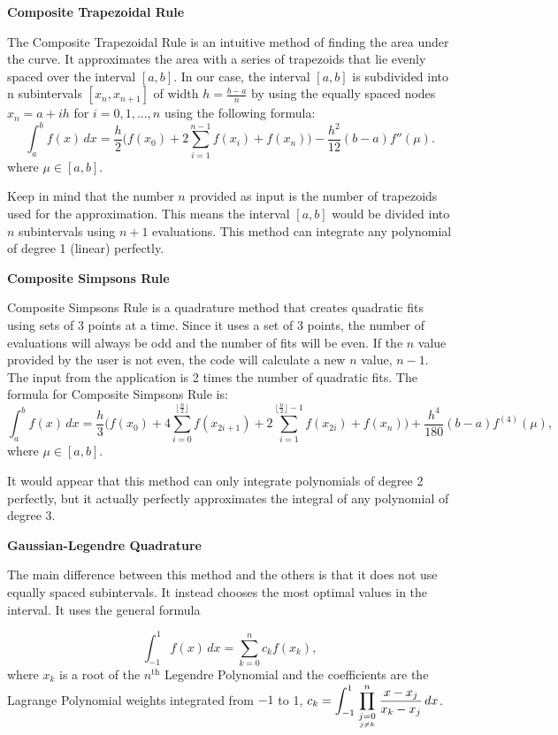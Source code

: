 \documentclass[12pt]{article}
\newcommand{\newLine}{\vspace{5mm}}
\newcommand{\integral}[3]{\text{$\int^{#2}_{#1} #3\,dx$}}
\newcommand{\summation}[3]{\text{$\sum^{#2}_{#1} #3$}}
\newcommand{\floor}[1]{\text{$\lfloor#1\rfloor$}}
\begin{document}
\newLine\noindent  \textbf{Composite Trapezoidal Rule}

The Composite Trapezoidal Rule is an intuitive method of finding the area under the curve. It approximates the area with a series of trapezoids that lie evenly spaced over the interval $[a,b]$.
In our case, the interval $[a,b]$ is subdivided into n subintervals $[x_n, x_{n+1}]$ of width $h = \frac{b-a}{n}$ by using the equally spaced nodes $x_n = a + ih$ for $i = 0,1,...,n$ using the following formula:
\begin{equation*} 
\integral{a}{b}{f(x)} = \frac{h}{2}\Big(f(x_0) + 2\summation{i = 1}{n-1}{f(x_i)} + f(x_n)\Big) - \frac{h^2}{12}(b-a)f''(\mu).
\end{equation*}
where $\mu\in[a,b]$.

Keep in mind that the number $n$ provided as input is the number of trapezoids used for the approximation. This means the interval $[a,b]$ would be divided into $n$ subintervals using $n+1$ evaluations. This method can integrate any polynomial of degree 1 (linear) perfectly.

\newLine\noindent\textbf{Composite Simpsons Rule}

Composite Simpsons Rule is a quadrature method that creates quadratic fits using sets of 3 points at a time. Since it uses a set of 3 points, the number of evaluations will always be odd and the number of fits will be even. If the $n$ value provided by the user is not even, the code will calculate a new $n$ value, $n-1$. The input from the application is 2 times the number of quadratic fits. The formula for Composite Simpsons Rule is:
\begin{equation*}  \integral{a}{b}{f(x)} = \frac{h}{3}\Big(f(x_0) + 4\summation{i=0}{\floor{\frac{n}{2}}}{f(x_{2i+1})} + 2\summation{i=1}{\floor{\frac{n}{2}}-1}{f(x_{2i})} + f(x_n)\Big) + \frac{h^4}{180}(b-a)f^{(4)}(\mu),
\end{equation*}
where $\mu\in[a,b]$.

It would appear that this method can only integrate polynomials of degree 2 perfectly, but it actually perfectly approximates the integral of any polynomial of degree 3.

\newLine\noindent\textbf{Gaussian-Legendre Quadrature}

The main difference between this method and the others is that it does not use equally spaced subintervals. It instead chooses the most optimal values in the interval. It uses the general formula

\begin{equation*} \integral{-1}{1}{f(x)} = \summation{k=0}{n}{c_kf(x_k)},
\end{equation*}
where $x_k$ is a root of the $n^{\text{th}}$ Legendre Polynomial and the coefficients are the Lagrange Polynomial weights integrated from $-1$ to 1, $c_k=\displaystyle\integral{-1}{1}{\prod_{\scriptstyle j=0\atop j\neq k}^n\frac{x-x_j}{x_k-x_j}}$.
\end{document}
